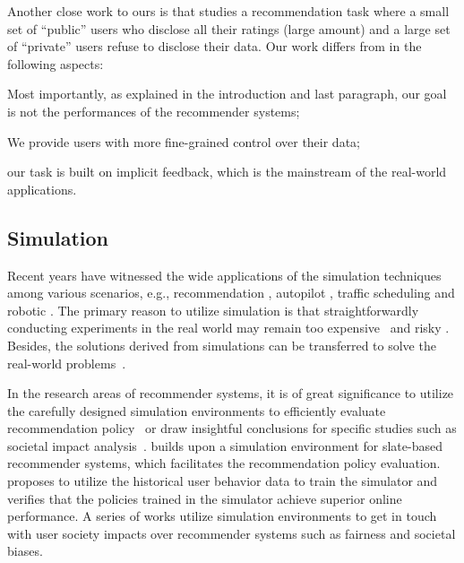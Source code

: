 Another close work to ours is \cite{Xin:nips14:Controlling} that studies a recommendation task where a small set of ``public'' users who disclose all their ratings (large amount) and a large set of ``private'' users refuse to disclose their data.
Our work differs from \cite{Xin:nips14:Controlling} in the following aspects:
\begin {enumerate*} [label=\roman*\upshape)]
\item Most importantly, as explained in the introduction and last paragraph, our goal is not the performances of the recommender systems;
\item We provide users with more fine-grained control over their data; 
\item our task is built on implicit feedback, which is the mainstream of the real-world applications.
\end {enumerate*} 




\subsection{Simulation}





Recent years have witnessed the wide applications of the simulation techniques among various scenarios, e.g., recommendation \cite{jannach2015recommenders,lucherini2021t,chaney2018algorithmic,yao2017beyond}, autopilot \cite{osinski2020simulation}, traffic scheduling \cite{chu2019multi,abdoos2020cooperative} and robotic \cite{rao2020rl}.
The primary reason to utilize simulation is that straightforwardly conducting experiments in the real world may remain too expensive~\cite{virtual_taobao} and risky \cite{osinski2020simulation}.
Besides, the solutions derived from simulations can be transferred to solve the real-world problems~\cite{virtual_taobao,tobin2017domain}.


In the research areas of recommender systems, it is of great significance to utilize the carefully designed simulation environments to efficiently evaluate recommendation policy~\cite{virtual_taobao} or draw insightful conclusions for specific studies such as societal impact analysis~\cite{chaney2018algorithmic}.
\citet{ie2019reinforcement} builds upon a simulation environment for slate-based recommender systems, which facilitates the recommendation policy evaluation. 
\citet{virtual_taobao} proposes to utilize the historical user behavior data to train the simulator and verifies that the policies trained in the simulator achieve superior online performance.
A series of works \cite{lucherini2021t,chaney2018algorithmic,yao2017beyond} utilize simulation environments to get in touch with user society impacts over recommender systems such as fairness and societal biases. 

